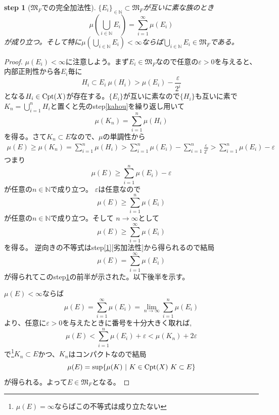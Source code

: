 \documentclass[leqno]{jsarticle}
\newtheorem{stp}{{\bf step}}
\newcommand{\nn}{\mathbb{N}}
\newcommand{\mgn}{\infty}
\newcommand{\dpst}{\displaystyle}
\newcommand{\mf}{\mathfrak{M}_F}
\newcommand{\ep}{\varepsilon}
\newcommand{\cpt}{{\rm Cpt}(X)}
\begin{document}
\begin{stp}[$\mf$での完全加法性]\label{4}$\{E_i\}_{\in\nn}\subset \mf$が互いに素な族のとき
\[
\mu(\bigcup_{i\in \nn}E_i)=\sum_{i=1}^{\mgn}\mu(E_i)
\]
が成り立つ。そして特に$\dpst \mu(\bigcup_{i\in \nn}E_i)<\mgn$ならば$\dpst \bigcup_{i\in \nn}E_i\in\mf$である。
\end{stp}
\begin{proof}
$\mu(E_i)<\mgn$に注意しよう。まず$E_i\in \mf$なので任意の$\ep>0$を与えると、内部正則性から各$E_i$毎に
\[
H_i\subset E_i\ \mu(H_i)>\mu(E_i)-\frac{\ep}{2^i}
\]
となる$H_i\in \cpt$が存在する。$\{E_i\}$が互いに素なので$\{H_i\}$も互いに素で
$\dpst K_n=\bigcup_{i=1}^nH_i$と置くと先のstep\ref{kahou}を繰り返し用いて
\[
\mu(K_n)=\sum_{i=1}^n\mu(H_i)
\]
を得る。さて$K_n\subset E$なので、$\mu$の単調性から
\begin{eqnarray*}
\mu(E)\ge \mu(K_n)=\sum_{i=1}^n\mu(H_i)>\sum_{i=1}^n\mu(E_i)-\sum_{i=1}^n\frac{\ep}{2^i}
>\sum_{i=1}^n\mu(E_i)-\ep
\end{eqnarray*}つまり
\[
\mu(E)\ge \sum_{i=1}^n\mu(E_i)-\ep
\]
が任意の$n\in \nn$で成り立つ。
$\ep$は任意なので
\[
\mu(E)\ge \sum_{i=1}^n\mu(E_i)
\]
が任意の$n\in \nn$で成り立つ。そして
$n\to \mgn$として
\[
\mu(E)\ge \sum_{i=1}^{\mgn}\mu(E_i)
\]
を得る。
逆向きの不等式はstep\ref{1}[劣加法性]から得られるので結局
\[
\mu(E)= \sum_{i=1}^{\mgn}\mu(E_i)
\]
が得られてこのstep\ref{4}の前半が示された。以下後半を示す。\par
$\mu(E)<\mgn$ならば
\[
\mu(E)= \sum_{i=1}^{\mgn}\mu(E_i)=\lim_{n\to \mgn}\sum_{i=1}^{n}\mu(E_i)
\]
より、任意に$\ep>0$を与えたときに番号を十分大きく取れば,
\[
\mu(E)<\sum_{i=1}^n\mu(E_i)+\ep <\mu(K_n)+2\ep
\]
で\footnote{$\mu(E)=\mgn$ならばこの不等式は成り立たない}$K_n\subset E$かつ、$K_n$はコンパクトなので結局
\[
\mu(E)=\sup\{\mu(K)\ |\ K\in \cpt\ K\subset E\}
\]
が得られる。よって$E\in \mf$となる。
\end{proof}
\end{document}
